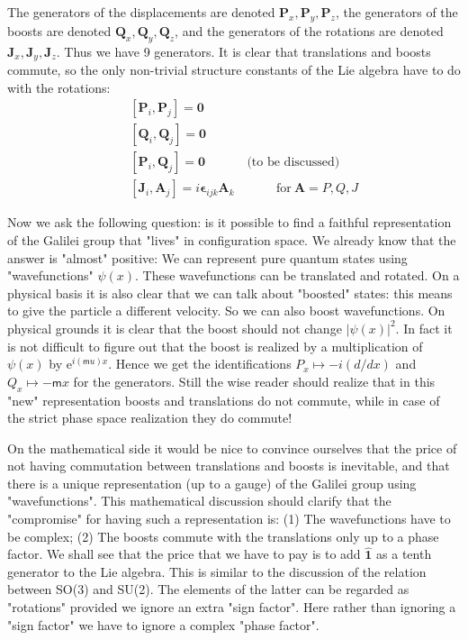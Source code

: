 \documentclass[onecolumn,fleqn, 11pt]{revtex4}
\newcommand{\eexp}{\mathrm{e}^}
\newcommand{\mass}{\mathsf{m}}
\newcommand{\beq}{\begin{eqnarray}}
\newcommand{\eeq}{\end{eqnarray}}
\begin{document}
The generators of the displacements 
are denoted $\mathbf{P}_{x}, \mathbf{P}_{y}, \mathbf{P}_{z}$, 
the generators of the boosts are 
denoted $\mathbf{Q}_{x}, \mathbf{Q}_{y}, \mathbf{Q}_{z}$, 
and the generators of the rotations are 
denoted $\mathbf{J}_{x}, \mathbf{J}_{y}, \mathbf{J}_{z}$. 
Thus we have 9 generators. It is clear 
that translations and boosts commute, so the only non-trivial 
structure constants of the Lie algebra have to do 
with the rotations:
\beq
&& \left[ \mathbf{P}_{i}, \mathbf{P}_{j}\right] = \mathbf{0} \\ 
&& \left[ \mathbf{Q}_{i}, \mathbf{Q}_{j}\right] = \mathbf{0} \\ 
&& \left[ \mathbf{P}_{i}, \mathbf{Q}_{j}\right] = \mathbf{0} 
\ \ \ \ \ \ \ \ \ \ \ \ \ \ \ \mbox{(to be discussed)} \\ 
&& \left[ \mathbf{J}_{i}, \mathbf{A}_{j}\right] = i \mathbf{\epsilon}_{ijk} \mathbf{A}_{k} 
\ \ \ \ \ \ \ \ \ \ \ \ \ \ \ \mbox{for} \ \mathbf{A}=P,Q,J 
\eeq


Now we ask the following question: is it 
possible to find a faithful representation  
of the Galilei group that "lives" 
in configuration space. We already know 
that the answer is "almost" positive: 
We can represent pure quantum states 
using "wavefunctions" $\psi(x)$.  
These wavefunctions can be translated and rotated.  
On a physical basis it is also clear that 
we can talk about "boosted" states: 
this means to give the particle a different velocity. 
So we can also boost wavefunctions. 
On physical grounds it is clear that 
the boost should not change $|\psi(x)|^2$. 
In fact it is not difficult to figure out 
that the boost is realized 
by a multiplication of $\psi(x)$ 
by $\eexp{i(\mass u)x}$.  Hence we get the 
identifications $P_x \mapsto -i(d/dx)$ 
and $Q_x \mapsto -\mass x$ for the generators.    
Still the wise reader should realize that 
in this "new" representation boosts and translations 
do not commute, while in case of the strict 
phase space realization they do commute!


On the mathematical side it would be nice 
to convince ourselves that the price of not having 
commutation between translations and boosts 
is inevitable, and that there is a unique 
representation (up to a gauge)  
of the Galilei group using "wavefunctions". 
This mathematical discussion should clarify 
that the "compromise" for having such a representation 
is: (1) The wavefunctions have to be complex; 
(2) The boosts commute with the translations 
only up to a phase factor. We shall see that 
the price that we have to pay is 
to add $\hat{\mathbf{1}}$ as a tenth generator 
to the Lie algebra. This is similar to 
the discussion of the relation 
between SO(3) and SU(2). The elements of 
the latter can be regarded as "rotations" provided  
we ignore an extra "sign factor". 
Here rather than ignoring a "sign factor" 
we have to ignore a complex "phase factor".   
\end{document}
